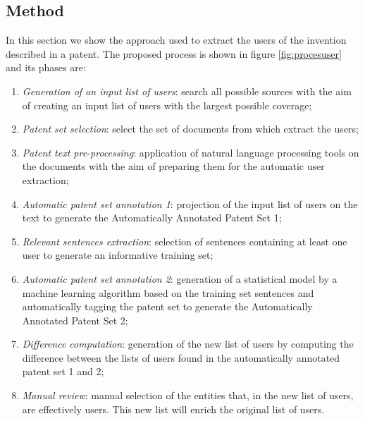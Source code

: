 \documentclass[]{book}
\theoremstyle{definition}
\theoremstyle{definition}
\theoremstyle{definition}
\theoremstyle{remark}
\begin{document}
\subsection{Method}\label{method}

In this section we show the approach used to extract the users of the
invention described in a patent. The proposed process is shown in figure
\ref{fig:procesuser} and its phases are:

\begin{enumerate}
\def\labelenumi{\arabic{enumi}.}
\item
  \emph{Generation of an input list of users}: search all possible
  sources with the aim of creating an input list of users with the
  largest possible coverage;
\item
  \emph{Patent set selection}: select the set of documents from which
  extract the users;
\item
  \emph{Patent text pre-processing}: application of natural language
  processing tools on the documents with the aim of preparing them for
  the automatic user extraction;
\item
  \emph{Automatic patent set annotation 1}: projection of the input list
  of users on the text to generate the Automatically Annotated Patent
  Set 1;
\item
  \emph{Relevant sentences extraction}: selection of sentences
  containing at least one user to generate an informative training set;
\item
  \emph{Automatic patent set annotation 2}: generation of a statistical
  model by a machine learning algorithm based on the training set
  sentences and automatically tagging the patent set to generate the
  Automatically Annotated Patent Set 2;
\item
  \emph{Difference computation}: generation of the new list of users by
  computing the difference between the lists of users found in the
  automatically annotated patent set 1 and 2;
\item
  \emph{Manual review}: manual selection of the entities that, in the
  new list of users, are effectively users. This new list will enrich
  the original list of users.
\end{enumerate}
\end{document}
